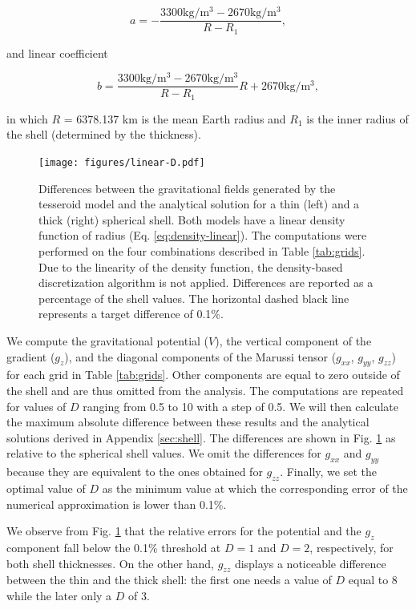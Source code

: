 \documentclass[extra, referee]{gji}
\begin{document}
\begin{equation}
    a = -\frac{3300\text{kg/m$^3$} - 2670\text{kg/m$^3$}}{R - R_1},
\end{equation}

\noindent and linear coefficient

\begin{equation}
    b = \frac{3300\text{kg/m$^3$} -
        2670\text{kg/m$^3$}}{R - R_1} R +
        2670\text{kg/m$^3$},
\end{equation}

\noindent
in which $R$ = 6378.137 km is the mean Earth radius and $R_1$ is the inner radius of the
shell (determined by the thickness).

\begin{figure}
\centering
\texttt{[image: figures/linear-D.pdf]}
\caption{
    Differences between the gravitational fields generated by the tesseroid model
    and the analytical solution for a thin (left) and a thick (right) spherical shell.
    Both models have a linear density function of radius (Eq. \ref{eq:density-linear}).
    The computations were performed on the four combinations described in
    Table \ref{tab:grids}.
    Due to the linearity of the density function, the density-based discretization
    algorithm is not applied.
    Differences are reported as a percentage of the shell values.
    The horizontal dashed black line represents a target difference of 0.1\%.
}
\label{fig:D-linear}
\end{figure}


We compute the gravitational potential ($V$), the vertical component of the gradient
($g_z$), and the diagonal components of the Marussi tensor ($g_{xx}$, $g_{yy}$,
$g_{zz}$) for each grid in Table \ref{tab:grids}.
Other components are equal to zero outside of the shell and are thus omitted from the
analysis.
The computations are repeated for values of $D$ ranging from 0.5 to 10 with a step of
0.5.
We will then calculate the maximum absolute difference between these results and the
analytical solutions derived in Appendix \ref{sec:shell}.
The differences are shown in Fig. \ref{fig:D-linear} as relative to the spherical shell
values.
We omit the differences for $g_{xx}$ and $g_{yy}$ because they are equivalent to the
ones obtained for $g_{zz}$.
Finally, we set the optimal value of $D$ as the minimum value at which the corresponding
error of the numerical approximation is lower than 0.1\%.

We observe from Fig. \ref{fig:D-linear} that the relative errors for the
potential and the $g_z$ component fall below the 0.1\% threshold at
$D=1$ and $D=2$, respectively, for both shell thicknesses.
On the other hand, $g_{zz}$ displays a noticeable
difference between the thin and the thick shell: the first one needs a
value of $D$ equal to 8 while the later only a $D$ of 3.
\end{document}

